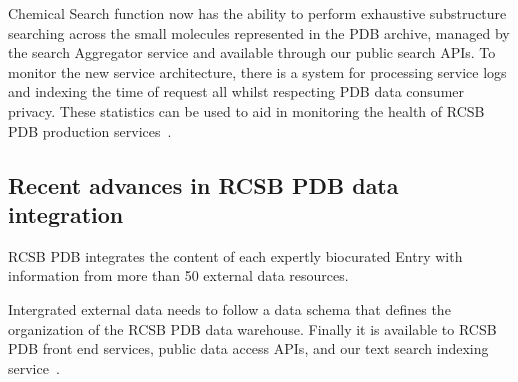 \documentclass{report}
\begin{document}
Chemical Search function now has the ability to perform exhaustive substructure searching across the small molecules represented in the PDB archive, managed by the search Aggregator service and available through our public search APIs. To monitor the new service architecture, there is a system for processing service logs and indexing the time of request all whilst respecting PDB data consumer privacy. These statistics can be used to aid in monitoring the health of RCSB PDB production services~\cite{burley_rcsb_2022}.

\subsection*{Recent advances in RCSB PDB data integration}

RCSB PDB integrates the content of each expertly biocurated Entry with information from more than 50 external data resources. 

Intergrated external data needs to follow a data schema that defines the organization of the RCSB PDB data warehouse. Finally it is  available to RCSB PDB front end services, public data access APIs, and our text search indexing service~\cite{burley_rcsb_2022}.
\end{document}
